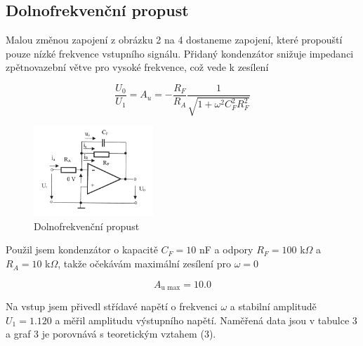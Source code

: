 \documentclass[a4paper,11pt]{article}
\begin{document}
\subsection{Dolnofrekvenční propust}

Malou změnou zapojení z obrázku 2 na 4 dostaneme zapojení, které propouští pouze nízké frekvence vstupního signálu. Přidaný kondenzátor snižuje impedanci zpětnovazební větve pro vysoké frekvence, což vede k zesílení

\begin{equation}
\frac{U_0}{U_1} = A_u = -\frac{R_F}{R_A} \frac{1}{ \sqrt{1 + \omega^2 C_F^2 R_F^2} } 
\end{equation}

\begin{figure}[h]
    \centering
    \includegraphics[width=0.4\textwidth]{propust.jpg}
    \caption{Dolnofrekvenční propust}
\end{figure}

Použil jsem kondenzátor o kapacitě $ C_F = 10  $ nF a odpory $ R_F = 100 $ k$\Omega$ a $ R_A = 10 $ k$ \Omega $, takže očekávám maximální zesílení pro $ \omega = 0 $ 

\begin{equation}
A_{\text{u max}} = 10.0
\end{equation}


Na vstup jsem přivedl střídavé napětí o frekvenci $ \omega $ a stabilní amplitudě $ U_1 = 1.120 $ a měřil amplitudu výstupního napětí. Naměřená data jsou v tabulce 3 a graf 3 je porovnává s teoretickým vztahem (3).
\end{document}
